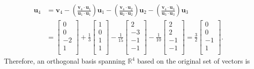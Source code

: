 \begin{align}
  \mathbf{u}_4 &= \mathbf{v}_4 - \left( \frac{ \mathbf{v}_4 \cdot \mathbf{u}_1 }{ \mathbf{u}_1 \cdot \mathbf{u}_1 } \right) \mathbf{u}_1 
                               - \left( \frac{ \mathbf{v}_4 \cdot \mathbf{u}_2 }{ \mathbf{u}_2 \cdot \mathbf{u}_2 } \right) \mathbf{u}_2 
                               - \left( \frac{ \mathbf{v}_4 \cdot \mathbf{u}_3 }{ \mathbf{u}_3 \cdot \mathbf{u}_3 } \right) \mathbf{u}_3 \nonumber \\
   &= \left[ \begin{array}{c} 0 \\  0 \\ -2 \\  1 \\ \end{array} \right] 
   + \frac{1}{3}  \left[ \begin{array}{c}  1 \\  0 \\   1 \\  1 \\ \end{array} \right]
   - \frac{1}{15} \left[ \begin{array}{c}  2 \\ -3 \\  -1 \\ -1 \\ \end{array} \right] 
   - \frac{1}{10} \left[ \begin{array}{c}  2 \\  2 \\  -1 \\ -1 \\ \end{array} \right]
    = \frac{3}{2} \left[ \begin{array}{c}  0 \\  0 \\  -1 \\  1 \\ \end{array} \right] .
\end{align}
Therefore, an orthogonal basis spanning $\mathbb{R}^4$ based on the original set of vectors is
